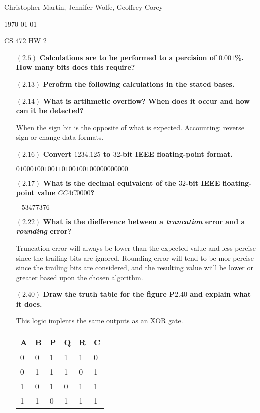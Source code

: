 \documentclass[letterpaper,10pt,titlepage]{article}
\def\name{Christopher Martin, Jennifer Wolfe, Geoffrey Corey}
\begin{document}
\hfill \name

\hfill \today

\hfill CS 472 HW 2

\begin{enumerate}
\item[$(2.5)$] \textbf{Calculations are to be performed to a percision of $0.001$\%. How many bits does this require?
}


\item[$(2.13)$] \textbf{Perofrm the following calculations in the stated bases.}

  
\item[$(2.14)$] \textbf{What is artihmetic overflow? When does it occur and how can it be detected?}

  When the sign bit is the opposite of what is expected. Accounting: reverse sign or change data formats.
  
\item[$(2.16)$] \textbf{Convert $1234.125$ to $32$-bit IEEE floating-point format.}

  $01000100100110100100100000000000$  
  
\item[$(2.17)$] \textbf{What is the decimal equivalent of the $32$-bit IEEE floating-point value $CC4C0000$?}

  $-53477376$

\item[$(2.22)$] \textbf{What is the diefference between a \textit{truncation} error and a \textit{rounding} error?}

  Truncation error will always be lower than the expected value and less percise since the trailing bits are ignored.
  Rounding error will tend to be mor percise since the trailing bits are considered, and the resulting value wiill be lower or greater based upon the chosen algorithm.
  
\item[$(2.40)$] \textbf{Draw the truth table for the figure P$2.40$ and explain what it does.}

  This logic implents the same outputs as an XOR gate.
\begin{center}
	\begin{tabular}{ | l  l || l  l  l || l |}
	\hline
	A & B & P & Q & R & C \\ \hline
	0 & 0 & 1 & 1 & 1 & 0 \\ \hline
	0 & 1 & 1 & 1 & 0 & 1 \\ \hline
	1 & 0 & 1 & 0 & 1 & 1 \\ \hline
	1 & 1 & 0 & 1 & 1 & 1 \\ \hline 
	\end{tabular}
\end{center}




\end{enumerate}
\end{document}
